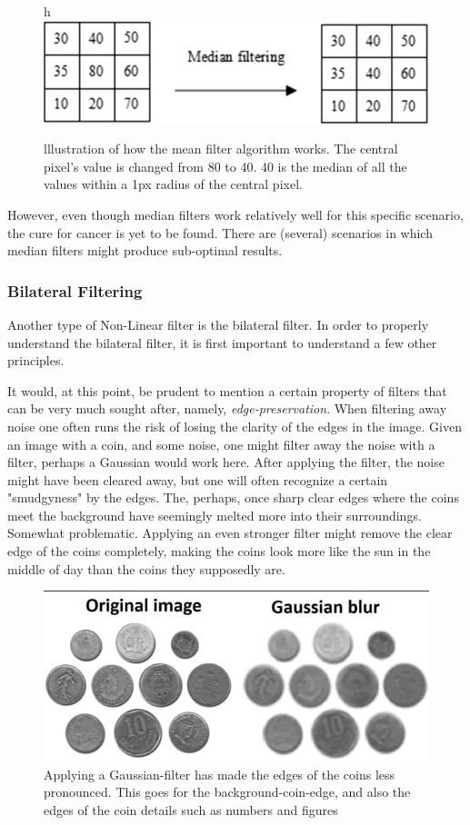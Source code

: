 \documentclass[twoside,a4paper,article]{combine}
\begin{document}
\begin{figure}{h}
    \centering
    \includegraphics[width=0.5\linewidth]{medianfiltering.PNG}
    \caption{lllustration of how the mean filter algorithm works. The central pixel's value is changed from 80 to 40. 40 is the median of all the values within a 1px radius of the central pixel.}
    \label{fig:enter-label}
\end{figure}
However, even though median filters work relatively well for this specific scenario, the cure for cancer is yet to be found. There are (several) scenarios in which median filters might produce sub-optimal results.

\subsubsection{Bilateral Filtering}
Another type of Non-Linear filter is the bilateral filter. In order to properly understand the bilateral filter, it is first important to understand a few other principles.

It would, at this point, be prudent to mention a certain property of filters that can be very much sought after, namely, \textit{edge-preservation}. When filtering away noise one often runs the risk of losing the clarity of the edges in the image. Given an image with a coin, and some noise, one might filter away the noise with a filter, perhaps a Gaussian would work here. After applying the filter, the noise might have been cleared away, but one will often recognize a certain "smudgyness" by the edges. The, perhaps, once sharp clear edges where the coins meet the background have seemingly melted more into their surroundings. Somewhat problematic. Applying an even stronger filter might remove the clear edge of the coins completely, making the coins look more like the sun in the middle of day than the coins they supposedly are.
\begin{figure}[H]
    \centering
    \includegraphics[width=0.5\linewidth]{coins.PNG}
    \caption{Applying a Gaussian-filter has made the edges of the coins less pronounced. This goes for the background-coin-edge, and also the edges of the coin details such as numbers and figures}
    \label{fig:enter-label}
\end{figure}
\end{document}

